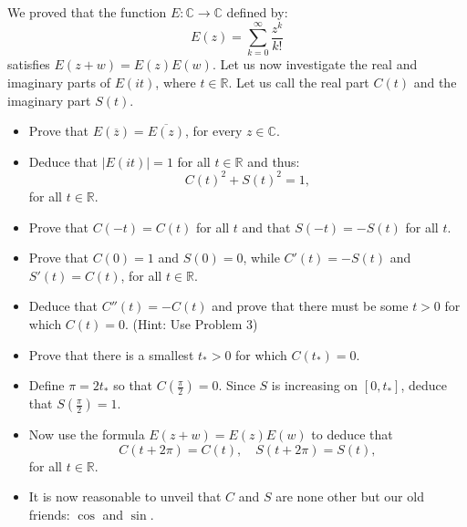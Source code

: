   \begin{exercise}
    We proved that the function $E : \mathbb{C} \to \mathbb{C}$ defined by:
    \begin{equation}
      E(z) = \sum_{k=0}^{\infty} \frac{z^k}{k!}
    \end{equation}
    satisfies $E(z + w) = E(z)E(w)$. Let us now investigate the real and imaginary parts of $E(it)$, where $t \in \mathbb{R}$. Let us call the real part $C(t)$ and the imaginary part $S(t)$.
    \begin{itemize}
      \item Prove that $E(\overline{z}) = \overline{E(z)}$, for every $z \in \mathbb{C}$.
      \item Deduce that $|E(it)| = 1$ for all $t \in \mathbb{R}$ and thus:
      \begin{equation}
        C(t)^2 + S(t)^2 = 1,
      \end{equation}
      for all $t \in \mathbb{R}$.
      \item Prove that $C(-t) = C(t)$ for all $t$ and that $S(-t) = -S(t)$ for all $t$.
      \item Prove that $C(0) = 1$ and $S(0) = 0$, while $C'(t) = -S(t)$ and $S'(t) = C(t)$, for all $t \in \mathbb{R}$.
      \item Deduce that $C''(t) = -C(t)$ and prove that there must be some $t > 0$ for which $C(t) = 0$. (Hint: Use Problem 3)
      \item Prove that there is a smallest $t_* > 0$ for which $C(t_*) = 0$.
      \item Define $\pi = 2t_*$ so that $C(\frac{\pi}{2}) = 0$. Since $S$ is increasing on $[0, t_*]$, deduce that $S(\frac{\pi}{2}) = 1$.
      \item Now use the formula $E(z + w) = E(z)E(w)$ to deduce that
      \begin{equation}
        C(t + 2\pi) = C(t), \quad S(t + 2\pi) = S(t),
      \end{equation}
      for all $t \in \mathbb{R}$.
      \item It is now reasonable to unveil that $C$ and $S$ are none other but our old friends: $\cos$ and $\sin$.
    \end{itemize}
  \end{exercise}
  \begin{solution}

  \end{solution}

